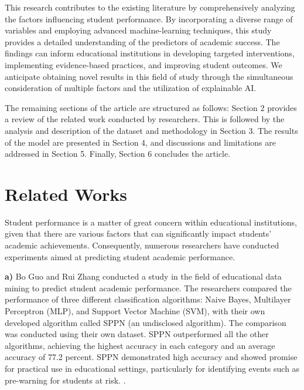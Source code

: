 \documentclass[conference]{IEEEtran}
\begin{document}
This research contributes to the existing literature by comprehensively analyzing the factors influencing student performance. By incorporating a diverse range of variables and employing advanced machine-learning techniques, this study provides a detailed understanding of the predictors of academic success. The findings can inform educational institutions in developing targeted interventions, implementing evidence-based practices, and improving student outcomes. We anticipate obtaining novel results in this field of study through the simultaneous consideration of multiple factors and the utilization of explainable AI.\par
The remaining sections of the article are structured as follows: Section 2 provides a review of the related work conducted by researchers. This is followed by the analysis and description of the dataset and methodology in Section 3. The results of the model are presented in Section 4, and discussions and limitations are addressed in Section 5. Finally, Section 6 concludes the article.



\section{Related Works}
Student performance is a matter of great concern within educational institutions, given that there are various factors that can significantly impact students' academic achievements. Consequently, numerous researchers have conducted experiments aimed at predicting student academic performance.\par
\vspace{3mm}
\textbf{a)} Bo Guo and Rui Zhang conducted a study in the field of educational data mining to predict student academic performance. The researchers compared the performance of three different classification algorithms: Naive Bayes, Multilayer Perceptron (MLP), and Support Vector Machine (SVM), with their own developed algorithm called SPPN (an undisclosed algorithm). The comparison was conducted using their own dataset. SPPN outperformed all the other algorithms, achieving the highest accuracy in each category and an average accuracy of 77.2 percent. SPPN demonstrated high accuracy and showed promise for practical use in educational settings, particularly for identifying events such as pre-warning for students at risk. \cite{r4}.
\vspace{3mm}
\end{document}
